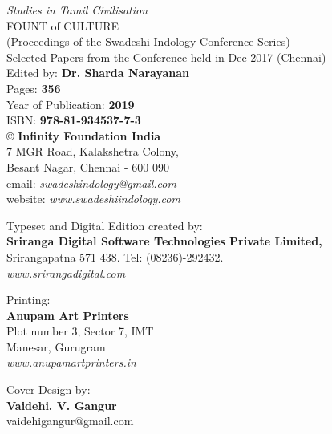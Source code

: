 \thispagestyle{empty}

 \textit{Studies in Tamil Civilisation}\\
 FOUNT of CULTURE\\ 
 (Proceedings of the Swadeshi Indology Conference Series)\\
 Selected Papers from the Conference held in Dec 2017 (Chennai)\\
 Edited by: \textbf{Dr. Sharda Narayanan}\\

 Pages: \textbf{356}\\
 Year of Publication: \textbf{2019}\\
 ISBN: \textbf{978-81-934537-7-3}\\

 © \textbf{Infinity Foundation India}\\
 7 MGR Road, Kalakshetra Colony,\\
 Besant Nagar, Chennai - 600 090\\
 email: \textit{swadeshindology@gmail.com}\\
 website: \textit{www.swadeshiindology.com}

 Typeset and Digital Edition created by:\\\textbf{Sriranga Digital Software Technologies Private Limited,}\\
 Srirangapatna 571 438. Tel: (08236)-292432.\\\textit{www.srirangadigital.com}

 Printing:\\\textbf{Anupam Art Printers}\\
 Plot number 3, Sector 7, IMT\\
 Manesar, Gurugram\\\textit{www.anupamartprinters.in}

 Cover Design by:\\\textbf{Vaidehi. V. Gangur}\\
 vaidehigangur@gmail.com

